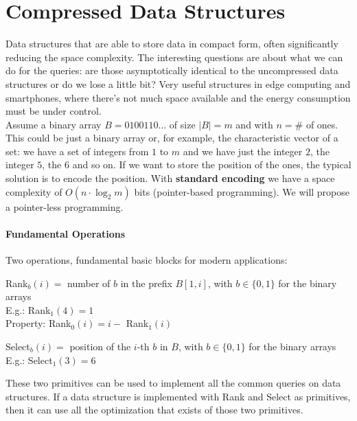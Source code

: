\documentclass[10pt]{report}
\begin{document}
\section{Compressed Data Structures} Data structures that are able to store data in compact form, often significantly reducing the space complexity. The interesting questions are about what we can do for the queries: are those asymptotically identical to the uncompressed data structures or do we lose a little bit? Very useful structures in edge computing and smartphones, where there's not much space available and the energy consumption must be under control.\\
Assume a binary array $B=0100110\ldots$ of size $|B| = m$ and with $n = \#$ of ones. This could be just a binary array or, for example, the characteristic vector of a set: we have a set of integers from $1$ to $m$ and we have just the integer $2$, the integer $5$, the $6$ and so on. If we want to store the position of the ones, the typical solution is to encode the position. With \textbf{standard encoding} we have a space complexity of $O(n\cdot\log_2 m)$ bits (pointer-based programming). We will propose a pointer-less programming.

\paragraph{Fundamental Operations}
Two operations, fundamental basic blocks for modern applications: \begin{list}{}{}
	\item Rank$_b(i) =$ number of $b$ in the prefix $B[1,i]$, with $b\in\{0,1\}$ for the binary arrays\\
	E.g.: Rank$_1(4) = 1$\\
	Property: Rank$_0(i) = i -$ Rank$_1(i)$
	\item Select$_b(i) =$ position of the $i$-th $b$ in $B$, with $b\in\{0,1\}$ for the binary arrays\\
	E.g.: Select$_1(3) = 6$
\end{list}
These two primitives can be used to implement all the common queries on data structures. If a data structure is implemented with Rank and Select as primitives, then it can use all the optimization that exists of those two primitives.
\end{document}
